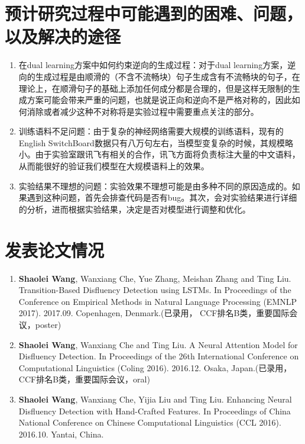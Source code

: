 \section{预计研究过程中可能遇到的困难、问题，以及解决的途径}

\begin{enumerate}
	\item 在dual learning方案中如何约束逆向的生成过程：对于dual learning方案，逆向的生成过程是由顺滑的（不含不流畅块）句子生成含有不流畅块的句子，在理论上，在顺滑句子的基础上添加任何成分都是合理的，但是这样无限制的生成方案可能会带来严重的问题，也就是说正向和逆向不是严格对称的，因此如何消除或者减少这种不对称将是实验过程中需要重点关注的部分。
	\item 训练语料不足问题：由于复杂的神经网络需要大规模的训练语料，现有的English SwitchBoard数据只有八万句左右，当模型变复杂的时候，其规模略小。由于实验室跟讯飞有相关的合作，讯飞方面将负责标注大量的中文语料，从而能很好的验证我们模型在大规模语料上的效果。
	\item 实验结果不理想的问题：实验效果不理想可能是由多种不同的原因造成的。如果遇到这种问题，首先会排查代码是否有bug。其次，会对实验结果进行详细的分析，进而根据实验结果，决定是否对模型进行调整和优化。
\end{enumerate}

\section{发表论文情况}
\begin{enumerate}
	\item \textbf{Shaolei Wang}, Wanxiang Che, Yue Zhang, Meishan Zhang and Ting Liu. Transition-Based Disfluency Detection using LSTMs. In Proceedings of the Conference on Empirical Methods in Natural Language Processing (EMNLP 2017). 2017.09. Copenhagen, Denmark.(已录用， CCF排名B类，重要国际会议，poster)
	\item \textbf{Shaolei Wang},  Wanxiang Che and Ting Liu. A Neural Attention Model for Disfluency Detection. In Proceedings of the 26th International Conference on Computational Linguistics (Coling 2016). 2016.12. Osaka, Japan.(已录用， CCF排名B类，重要国际会议，oral)
	\item \textbf{Shaolei Wang},  Wanxiang Che, Yijia Liu and Ting Liu. Enhancing Neural Disfluency Detection with Hand-Crafted Features. In Proceedings of China National Conference on Chinese Computational Linguistics (CCL 2016). 2016.10. Yantai, China.
\end{enumerate}

\clearpage

\newpage